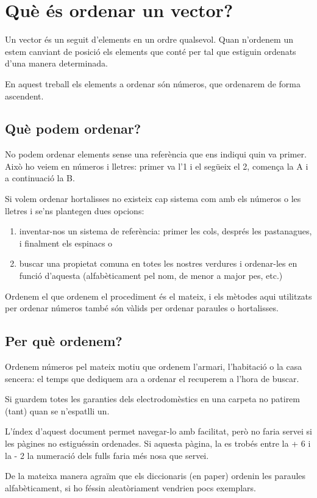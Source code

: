 \chapter{Què és ordenar un vector?}
Un vector és un seguit d'elements en un ordre qualsevol.
Quan n'ordenem un estem canviant de posició els elements que conté per tal que estiguin ordenats d'una manera determinada.

En aquest treball els elements a ordenar són números, que ordenarem de forma ascendent.

\section{Què podem ordenar?}
No podem ordenar elements sense una referència que ens indiqui quin va primer.
Això ho veiem en números i lletres: primer va l'1 i el següeix el 2, comença la A i a continuació la B.

Si volem ordenar hortalisses no existeix cap sistema com amb els números o les lletres i se'ns plantegen dues opcions:
\begin{enumerate}[label={\alph*)}]
	\item inventar-nos un sistema de referència: primer les cols, després les pastanagues, i finalment els espinacs o
	\item buscar una propietat comuna en totes les nostres verdures i ordenar-les en funció d'aquesta (alfabèticament pel nom, de menor a major pes, etc.)
\end{enumerate}

Ordenem el que ordenem el procediment és el mateix, i els mètodes aqui utilitzats per ordenar números també són vàlids per ordenar paraules o hortalisses.

\pagebreak
\section{Per què ordenem?}
Ordenem números pel mateix motiu que ordenem l'armari, l'habitació o la casa sencera: el temps que dediquem ara a ordenar el recuperem a l'hora de buscar.

Si guardem totes les garanties dels electrodomèstics en una carpeta no patirem (tant) quan se n'espatlli un.

L'índex d'aquest document permet navegar-lo amb facilitat, però no faria servei si les pàgines no estiguéssin ordenades. Si aquesta pàgina, la {\thepage} es trobés entre la {\the\numexpr \thepage + 6} i la {\the\numexpr \thepage - 2} la numeració dels fulls faria més nosa que servei.

De la mateixa manera agraïm que els diccionaris (en paper) ordenin les paraules alfabèticament, si ho féssin aleatòriament vendrien pocs exemplars.